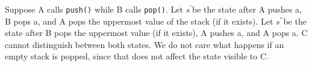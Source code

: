 \documentclass[a4paper,10pt]{article}
\newcommand{\Sp}{$s^{'}$}
\newcommand{\Spp}{$s^{''}$}
\begin{document}
Suppose A calls \lstinline|push()| while B calls \lstinline|pop()|. Let \Sp be the state after A pushes a, B pops a, and A pops the uppermost value of the stack (if it exists). Let \Spp be the state after B pops the uppermost value (if it exists), A pushes a, and A pops a. C cannot distinguish between both states. We do not care what happens if an empty stack is popped, since that does not affect the state visible to C.

\vspace{3mm}


\begin{comment}

Exercise 51: p139

\subsection{Exercise }

\emph{}

\vspace{3mm}

\vspace{3mm}

\begin{align}
S(p) &= \frac{s}{s'} = \frac{2s(p - 1)}{s(p - 1) - 1} \\
     &= \frac{2 \cdot \frac{3}{10} \cdot (p - 1)}{\frac{3}{10} \cdot (p - 1) - 1} 
\end{align}

\begin{figure}
\begin{lstlisting}

\end{lstlisting}
\caption{The Flaky lock used in Exercise 11.}
\label{fig:flaky}
\end{figure}

\end{comment}
\end{document}
